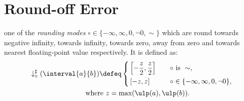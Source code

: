 \section{Round-off Error}

one of the \emph{rounding modes} $\circ \in \{ -\infty, \infty, 0, \neg0, \sim
\}$ which are round towards negative infinity, towards infinity, towards zero,
away from zero and towards nearest floating-point value respectively.  It is
defined as:
\begin{equation}
    \begin{aligned}
        & \downarrow^\sharp_\circ(\interval{a}{b}) \defeq \left\{
            \begin{aligned}
                & \left[ -\frac{z}{2}, \frac{z}{2}\right]
                    & \quad \circ & \text{~is~}\sim, \\
                & \left[ -z, z\right]
                    & \quad \circ & \in \{ -\infty, \infty, 0, \neg0 \},
            \end{aligned}
        \right. \\
        & \qquad\qquad\qquad\qquad \text{where~} z = \max(\ulp(a), \ulp(b)).
    \end{aligned}
\end{equation}
